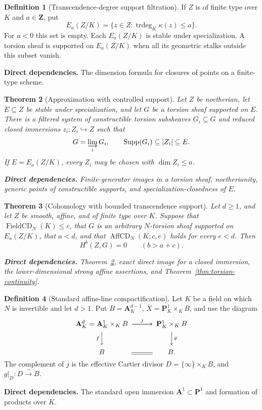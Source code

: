 \documentclass[10pt]{article}
\newtheorem{theorem}{Theorem}[section]
\theoremstyle{definition}
\newtheorem{definition}[theorem]{Definition}
\newcommand{\deps}[1]{\par\smallskip\noindent\textbf{Direct dependencies.} #1}
\begin{document}
\begin{definition}[Transcendence-degree support filtration]
\label{def:transcendence-support}
If $Z$ is of finite type over $K$ and $a\in\mathbf Z$, put
\[
 E_a(Z/K)=
 \{z\in Z:\operatorname{trdeg}_K\kappa(z)\leq a\}.
\]
For $a<0$ this set is empty.  Each $E_a(Z/K)$ is stable under
specialization.  A torsion sheaf is supported on $E_a(Z/K)$ when all its
geometric stalks outside this subset vanish.
\deps{The dimension formula for closures of points on a finite-type scheme.}
\end{definition}

\begin{theorem}[Approximation with controlled support]
\label{thm:support-approximation}
Let $Z$ be noetherian, let $E\subseteq Z$ be stable under specialization,
and let $G$ be a torsion sheaf supported on $E$.  There is a filtered system
of constructible torsion subsheaves $G_i\subseteq G$ and reduced closed
immersions $z_i:Z_i\hookrightarrow Z$ such that
\[
 G=\varinjlim_iG_i,
 \qquad
 \operatorname{Supp}(G_i)\subseteq |Z_i|\subseteq E.
\]
If $E=E_a(Z/K)$, every $Z_i$ may be chosen with $\dim Z_i\leq a$.
\deps{Finite-generator images in a torsion sheaf, noetherianity, generic
points of constructible supports, and specialization-closedness of $E$.}
\end{theorem}

\begin{theorem}[Cohomology with bounded transcendence support]
\label{thm:supported-affine-cd}
Let $d\geq1$, and let $Z$ be smooth, affine, and of finite type over $K$.
Suppose that
$\operatorname{FieldCD}_N(K)\leq c$, that $G$ is an arbitrary $N$-torsion
sheaf supported on $E_a(Z/K)$, that $a<d$, and that
$\operatorname{AffCD}_N(K;c,e)$ holds for every $e<d$.  Then
\[
 H^b(Z,G)=0\qquad(b>a+c).
\]
\deps{Theorem~\ref{thm:support-approximation}, exact direct image for a
closed immersion, the lower-dimensional strong affine assertions, and
Theorem~\ref{thm:torsion-continuity}.}
\end{theorem}

\begin{definition}[Standard affine-line compactification]
\label{def:standard-a1-compactification}
Let $K$ be a field on which $N$ is invertible and let $d>1$.  Put
$B=\mathbf A^{d-1}_K$, $\overline X=\mathbf P^1_K\times_KB$, and use the
diagram
\[
\begin{CD}
 \mathbf A^d_K=\mathbf A^1_K\times_KB @>{j}>>
 \mathbf P^1_K\times_KB\\
 @V{f}VV @VV{g}V\\
 B @= B.
\end{CD}
\]
The complement of $j$ is the effective Cartier divisor
$D=\{\infty\}\times_KB$, and $g|_D:D\xrightarrow{\sim}B$.
\deps{The standard open immersion $\mathbf A^1\subset\mathbf P^1$ and
formation of products over $K$.}
\end{definition}
\end{document}
